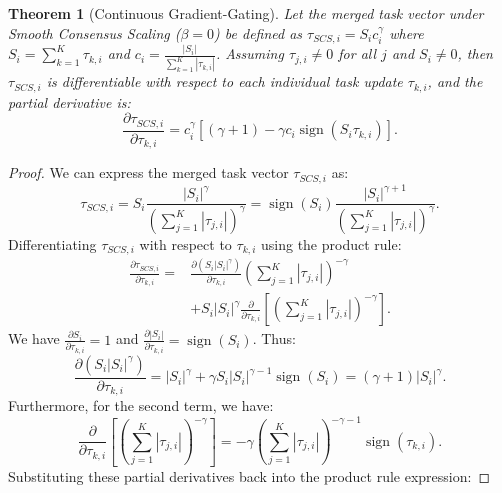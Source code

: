 \documentclass{article}
\theoremstyle{plain}
\newtheorem{theorem}{Theorem}[section]
\theoremstyle{definition}
\theoremstyle{remark}
\begin{document}
\begin{theorem}[Continuous Gradient-Gating]
Let the merged task vector under Smooth Consensus Scaling ($\beta = 0$) be defined as $\tau_{SCS, i} = S_i c_i^\gamma$ where $S_i = \sum_{k=1}^K \tau_{k, i}$ and $c_i = \frac{|S_i|}{\sum_{k=1}^K |\tau_{k, i}|}$. Assuming $\tau_{j, i} \ne 0$ for all $j$ and $S_i \ne 0$, then $\tau_{SCS, i}$ is differentiable with respect to each individual task update $\tau_{k, i}$, and the partial derivative is:
\begin{equation}
    \frac{\partial \tau_{SCS, i}}{\partial \tau_{k, i}} = c_i^\gamma \left[ (\gamma + 1) - \gamma c_i \operatorname{sign}(S_i \tau_{k, i}) \right].
\end{equation}
\end{theorem}

\begin{proof}
We can express the merged task vector $\tau_{SCS, i}$ as:
\begin{equation*}
    \tau_{SCS, i} = S_i \frac{|S_i|^\gamma}{\left( \sum_{j=1}^K |\tau_{j, i}| \right)^\gamma} = \operatorname{sign}(S_i) \frac{|S_i|^{\gamma+1}}{\left( \sum_{j=1}^K |\tau_{j, i}| \right)^\gamma}.
\end{equation*}
Differentiating $\tau_{SCS, i}$ with respect to $\tau_{k, i}$ using the product rule:
\begin{align*}
    \frac{\partial \tau_{SCS, i}}{\partial \tau_{k, i}} ={}& \frac{\partial (S_i |S_i|^\gamma)}{\partial \tau_{k, i}} \left( \sum_{j=1}^K |\tau_{j, i}| \right)^{-\gamma} \\
    & + S_i |S_i|^\gamma \frac{\partial}{\partial \tau_{k, i}} \left[ \left( \sum_{j=1}^K |\tau_{j, i}| \right)^{-\gamma} \right].
\end{align*}
We have $\frac{\partial S_i}{\partial \tau_{k, i}} = 1$ and $\frac{\partial |S_i|}{\partial \tau_{k, i}} = \operatorname{sign}(S_i)$. Thus:
\begin{equation*}
    \frac{\partial (S_i |S_i|^\gamma)}{\partial \tau_{k, i}} = |S_i|^\gamma + \gamma S_i |S_i|^{\gamma-1} \operatorname{sign}(S_i) = (\gamma+1) |S_i|^\gamma.
\end{equation*}
Furthermore, for the second term, we have:
\begin{equation*}
    \frac{\partial}{\partial \tau_{k, i}} \left[ \left( \sum_{j=1}^K |\tau_{j, i}| \right)^{-\gamma} \right] = -\gamma \left( \sum_{j=1}^K |\tau_{j, i}| \right)^{-\gamma-1} \operatorname{sign}(\tau_{k, i}).
\end{equation*}
Substituting these partial derivatives back into the product rule expression:

\end{proof}
\end{document}
